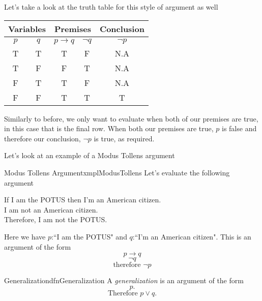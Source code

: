 Let's take a look at the truth table for this style of argument as well
\begin{center}
    \begin{tabular}{|c|c|c|c|c|}
        \hline
        \multicolumn{2}{|c|}{Variables} & \multicolumn{2}{|c|}{Premises} & Conclusion                         \\
        \hline
        $p$                             & $q$                            & $p \to q$  & $\lnot q$ & $\lnot p$ \\
        \hline
        T                               & T                              & T          & F         & N.A       \\
        \hline
        T                               & F                              & F          & T         & N.A       \\
        \hline
        F                               & T                              & T          & F         & N.A       \\
        \hline
        F                               & F                              & T          & T         & T         \\
        \hline
    \end{tabular}
\end{center}

Similarly to before, we only want to evaluate when both of our premises are true, in this case that is the final row. When both our premises are true, $p$ is false and therefore our conclusion, $\lnot p$ is true, as required.

Let's look at an example of a Modus Tollens argument

\begin{exmpl}[label={exmpl:modusTollens}]{Modus Tollens Argument}{xmplModusTollens}
    Let's evaluate the following argument
    \begin{center}
        If I am the POTUS then I'm an American citizen.\\
        I am not an American citizen.\\
        Therefore, I am not the POTUS.
    \end{center}
    Here we have $p$:``I am the POTUS" and $q$:``I'm an American citizen". This is an argument of the form
    $$p \to q$$
    $$\lnot q$$
    $$\text{therefore } \lnot p$$
\end{exmpl}

\begin{dfn}[label={def:generalization}]{Generalization}{dfnGeneralization}
    A \emph{generalization} is an argument of the form
    $$p.$$
    $$\text{Therefore } p \lor q.$$
\end{dfn}

